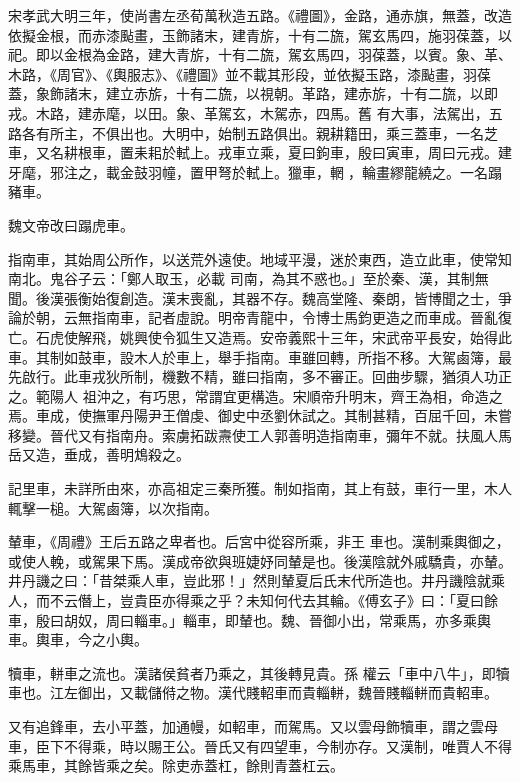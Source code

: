 \begin{pinyinscope}
 宋孝武大明三年，使尚書左丞荀萬秋造五路。《禮圖》，金路，通赤旗，無蓋，改造依擬金根，而赤漆颭畫，玉飾諸末，建青旂，十有二旒，駕玄馬四，施羽葆蓋，以祀。即以金根為金路，建大青旂，十有二旒，駕玄馬四，羽葆蓋，以賓。象、革、木路，《周官》、《輿服志》、《禮圖》並不載其形段，並依擬玉路，漆颭畫，羽葆蓋，象飾諸末，建立赤旂，十有二旒，以視朝。革路，建赤旂，十有二旒，以即戎。木路，建赤麾，以田。象、革駕玄，木駕赤，四馬。舊
 有大事，法駕出，五路各有所主，不俱出也。大明中，始制五路俱出。親耕籍田，乘三蓋車，一名芝車，又名耕根車，置耒耜於軾上。戎車立乘，夏曰鉤車，殷曰寅車，周曰元戎。建牙麾，邪注之，載金鼓羽幢，置甲弩於軾上。獵車，輞𨏥，輪畫繆龍繞之。一名蹋豬車。



 魏文帝改曰蹋虎車。



 指南車，其始周公所作，以送荒外遠使。地域平漫，迷於東西，造立此車，使常知南北。鬼谷子云：「鄭人取玉，必載
 司南，為其不惑也。」至於秦、漢，其制無聞。後漢張衡始復創造。漢末喪亂，其器不存。魏高堂隆、秦朗，皆博聞之士，爭論於朝，云無指南車，記者虛說。明帝青龍中，令博士馬鈞更造之而車成。晉亂復亡。石虎使解飛，姚興使令狐生又造焉。安帝義熙十三年，宋武帝平長安，始得此車。其制如鼓車，設木人於車上，舉手指南。車雖回轉，所指不移。大駕鹵簿，最先啟行。此車戎狄所制，機數不精，雖曰指南，多不審正。回曲步驟，猶須人功正之。範陽人
 祖沖之，有巧思，常謂宜更構造。宋順帝升明末，齊王為相，命造之焉。車成，使撫軍丹陽尹王僧虔、御史中丞劉休試之。其制甚精，百屈千回，未嘗移變。晉代又有指南舟。索虜拓跋燾使工人郭善明造指南車，彌年不就。扶風人馬岳又造，垂成，善明鴆殺之。



 記里車，未詳所由來，亦高祖定三秦所獲。制如指南，其上有鼓，車行一里，木人輒擊一槌。大駕鹵簿，以次指南。



 輦車，《周禮》王后五路之卑者也。后宮中從容所乘，非王
 車也。漢制乘輿御之，或使人輓，或駕果下馬。漢成帝欲與班婕妤同輦是也。後漢陰就外戚驕貴，亦輦。井丹譏之曰：「昔桀乘人車，豈此邪！」然則輦夏后氏末代所造也。井丹譏陰就乘人，而不云僭上，豈貴臣亦得乘之乎？未知何代去其輪。《傅玄子》曰：「夏曰餘車，殷曰胡奴，周曰輜車。」輜車，即輦也。魏、晉御小出，常乘馬，亦多乘輿車。輿車，今之小輿。



 犢車，軿車之流也。漢諸侯貧者乃乘之，其後轉見貴。孫
 權云「車中八牛」，即犢車也。江左御出，又載儲偫之物。漢代賤軺車而貴輜軿，魏晉賤輜軿而貴軺車。



 又有追鋒車，去小平蓋，加通幔，如軺車，而駕馬。又以雲母飾犢車，謂之雲母車，臣下不得乘，時以賜王公。晉氏又有四望車，今制亦存。又漢制，唯賈人不得乘馬車，其餘皆乘之矣。除吏赤蓋杠，餘則青蓋杠云。




\end{pinyinscope}

